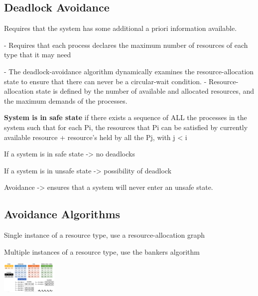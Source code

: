  \subsection{Deadlock Avoidance}
 
 Requires that the system has some additional a priori information available.\par
 - Requires that each process declares the maximum number of resources of each type that it may need\par
 - The deadlock-avoidance algorithm dynamically examines the resource-allocation state to ensure that there can never be a circular-wait condition.
 - Resource-allocation state is defined by the number of available and allocated resources, and the maximum demands of the processes.\par
 
 \textbf{System is in safe state} if there exists a sequence of ALL the processes in the system such that for each Pi, the resources that Pi can be satisfied by currently available resource + resource's held by all the Pj, with j < i \par
 
 If a system is in safe state -> no deadlocks\par
 If a system is in unsafe state -> possibility of deadlock\par
 Avoidance -> ensures that a system will never enter an unsafe state.
 
 
\subsection{Avoidance Algorithms}

Single instance of a resource type, use a resource-allocation graph\par
Multiple instances of a resource type, use the bankers algorithm\par

\includegraphics[width=0.20\textwidth]{ConcurrencyErrors/bankers.png}